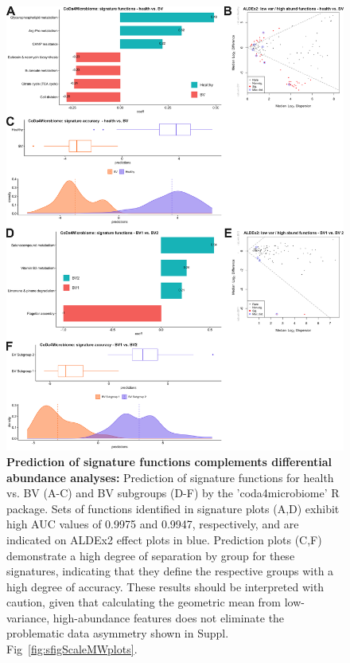 \documentclass[sn-mathphys,Numbered]{sn-jnl}%
\begin{document}
\begin{figure}[H]
    \centering
    \includegraphics[scale = 0.84]{0_supplFig7.png}
    \caption{\textbf{Prediction of signature functions complements differential abundance analyses:} Prediction of signature functions for health vs. BV (A-C) and BV subgroups (D-F) by the 'coda4microbiome' R package. Sets of functions identified in signature plots (A,D) exhibit high AUC values of 0.9975 and 0.9947, respectively, and are indicated on ALDEx2 effect plots in blue. Prediction plots (C,F) demonstrate a high degree of separation by group for these signatures, indicating that they define the respective groups with a high degree of accuracy. These results should be interpreted with caution, given that calculating the geometric mean from low-variance, high-abundance features does not eliminate the problematic data asymmetry shown in Suppl. Fig~\ref{fig:sfigScaleMWplots}.} \label{fig:sfigVirgCoda4Mfigs}
\end{figure}
\newpage
\end{document}
